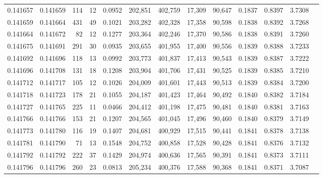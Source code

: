 \begin{tabular}{rrrrrrrrrrrrr}
0.141657 & 0.141659 &   114 &  12 &                                     0.0952 & 202,851 & 402,759 &  17,309 &  90,647 & 0.1837 & 0.8397 & 3.7308 \\
0.141659 & 0.141664 &   431 &  49 &                                     0.1021 & 203,282 & 402,328 &  17,358 &  90,598 & 0.1838 & 0.8392 & 3.7268 \\
0.141664 & 0.141672 &    82 &  12 &                                     0.1277 & 203,364 & 402,246 &  17,370 &  90,586 & 0.1838 & 0.8391 & 3.7260 \\
0.141675 & 0.141691 &   291 &  30 &                                     0.0935 & 203,655 & 401,955 &  17,400 &  90,556 & 0.1839 & 0.8388 & 3.7233 \\
0.141692 & 0.141696 &   118 &  13 &                                     0.0992 & 203,773 & 401,837 &  17,413 &  90,543 & 0.1839 & 0.8387 & 3.7222 \\
0.141696 & 0.141708 &   131 &  18 &                                     0.1208 & 203,904 & 401,706 &  17,431 &  90,525 & 0.1839 & 0.8385 & 3.7210 \\
0.141712 & 0.141717 &   105 &  12 &                                     0.1026 & 204,009 & 401,601 &  17,443 &  90,513 & 0.1839 & 0.8384 & 3.7200 \\
0.141718 & 0.141723 &   178 &  21 &                                     0.1055 & 204,187 & 401,423 &  17,464 &  90,492 & 0.1840 & 0.8382 & 3.7184 \\
0.141727 & 0.141765 &   225 &  11 &                                     0.0466 & 204,412 & 401,198 &  17,475 &  90,481 & 0.1840 & 0.8381 & 3.7163 \\
0.141766 & 0.141766 &   153 &  21 &                                     0.1207 & 204,565 & 401,045 &  17,496 &  90,460 & 0.1840 & 0.8379 & 3.7149 \\
0.141773 & 0.141780 &   116 &  19 &                                     0.1407 & 204,681 & 400,929 &  17,515 &  90,441 & 0.1841 & 0.8378 & 3.7138 \\
0.141781 & 0.141790 &    71 &  13 &                                     0.1548 & 204,752 & 400,858 &  17,528 &  90,428 & 0.1841 & 0.8376 & 3.7132 \\
0.141792 & 0.141792 &   222 &  37 &                                     0.1429 & 204,974 & 400,636 &  17,565 &  90,391 & 0.1841 & 0.8373 & 3.7111 \\
0.141796 & 0.141796 &   260 &  23 &                                     0.0813 & 205,234 & 400,376 &  17,588 &  90,368 & 0.1841 & 0.8371 & 3.7087 \\

\end{tabular}
